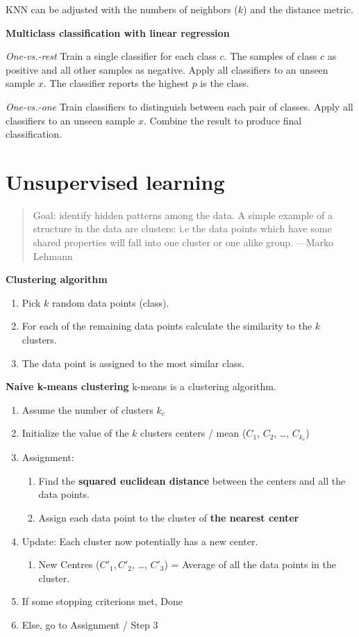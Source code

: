 \documentclass[11pt,twoside,landscape]{article}
\begin{document}
\begin{multicols}{3}
KNN can be adjusted with the numbers of neighbors (\(k\)) and the distance metric.


\textbf{Multiclass classification with linear regression}

\emph{One-vs.-rest}
Train a single classifier for each class \(c\).
The samples of class \(c\) as positive and all other samples as negative.
Apply all classifiers to an unseen sample \(x\).
The classifier reports the highest \(p\) is the class.


\emph{One-vs.-one}
Train classifiers to distinguish between each pair of classes.
Apply all classifiers to an unseen sample \(x\).
Combine the result to produce final classification.

\section{Unsupervised learning}
\label{sec:orgef67894}
\begin{quote}
Goal: identify hidden patterns among the data.
A simple example of a structure in the data
are clusters: i.e the data points which
have some shared properties will fall into
one cluster or one alike group. ---Marko Lehmann
\end{quote}


\textbf{Clustering algorithm}
\begin{enumerate}
\item Pick \(k\) random data points (class).
\item For each of the remaining data points calculate the similarity to the \(k\) clusters.
\item The data point is assigned to the most similar class.
\end{enumerate}


\textbf{Naive k-means clustering}
k-means is a clustering algorithm.

\begin{enumerate}
\item Assume the number of clusters \(k_c\)
\item Initialize the value of the \(k\) clusters centers / mean (\(C_1\), \(C_2\), \ldots{}, \(C_{k_c}\))
\item Assignment:
\begin{enumerate}
\item Find the \textbf{squared euclidean distance} between the centers and all the data points.
\item Assign each data point to the cluster of \textbf{the nearest center}
\end{enumerate}
\item Update: Each cluster now potentially has a new center.
\begin{enumerate}
\item New Centres (\(C'_1, C'_2\), \ldots{}, \(C'_3\)) = Average of all the data points in the cluster.
\end{enumerate}
\item If some stopping criterions met, Done
\item Else, go to Assignment / Step 3
\end{enumerate}



\end{multicols}
\end{document}
